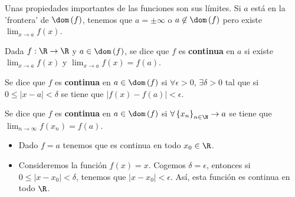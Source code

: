 Unas propiedades importantes de las funciones son sus límites. Si $\displaystyle a  $ está en la 'frontera' de $\displaystyle \dom\left(f\right) $, tenemos que $\displaystyle a = \pm \infty $ o $\displaystyle a \not\in \dom\left(f\right) $ pero existe $\displaystyle \lim_{x \to a}f\left(x\right) $. 
\begin{fdefinition}[Continuidad]
\normalfont Dada $\displaystyle f : \R \to \R $ y $\displaystyle a \in \dom\left(f\right) $, se dice que $\displaystyle f $ es \textbf{continua} en $\displaystyle a $ si existe $\displaystyle \lim_{x \to a}f\left(x\right) $ y $\displaystyle \lim_{x \to a}f\left(x\right) = f\left(a\right) $.
\end{fdefinition}
\begin{fdefinition}[Continuidad]
\normalfont Se dice que $\displaystyle f $ es \textbf{continua} en $\displaystyle a \in \dom\left(f\right) $ si $\displaystyle \forall \epsilon > 0 $, $\displaystyle \exists \delta > 0 $ tal que si $\displaystyle 0 \leq \left|x - a\right| < \delta  $ se tiene que $\displaystyle \left|f\left(x\right) - f\left(a\right)\right| < \epsilon  $.
\end{fdefinition}
\begin{fdefinition}[Continuidad]
	\normalfont Se dice que $\displaystyle f $ es \textbf{continua} en $\displaystyle a \in \dom\left(f\right) $ si $\displaystyle \forall \left\{ x_{n}\right\} _{n\in\N} \to a $ se tiene que $\displaystyle \lim_{n \to \infty}f\left(x_{n}\right) = f\left(a\right) $.
\end{fdefinition}
\begin{eg}
\normalfont 
\begin{itemize}
\item Dado $\displaystyle f = a $ tenemos que es continua en todo $\displaystyle x_{0} \in \R $.
\item Consideremos la función $\displaystyle f\left(x\right) = x $. Cogemos $\displaystyle \delta = \epsilon  $, entonces si $\displaystyle 0 \leq \left|x - x_{0}\right| < \delta  $, tenemos que $\displaystyle \left|x - x_{0}\right| < \epsilon  $. Así, esta función es continua en todo $\displaystyle \R $.
\end{itemize}
\end{eg}

